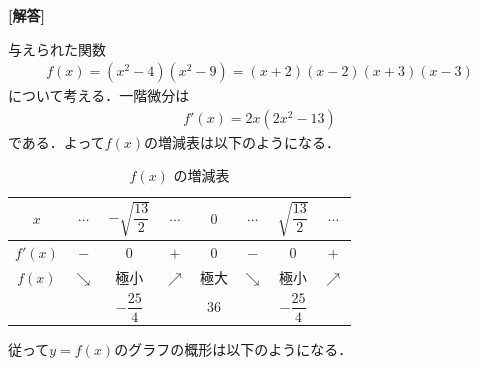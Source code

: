 \documentclass[../../main.tex]{subfiles}
\begin{document}
\begin{oframed}
  
\end{oframed}
{\bf [解答]}

与えられた関数
\begin{align}
  f(x) = (x^2-4)(x^2-9) = (x+2)(x-2)(x+3)(x-3) \label{eq:1}
\end{align}
について考える．一階微分は
\begin{align}
  f'(x)=2x(2x^2-13) \label{eq:2}
\end{align}
である．よって$f(x)$の増減表は以下のようになる．

\begin{table}[htb]
  \centering
  \caption{$f(x)$ の増減表}
  \renewcommand{\arraystretch}{1.3}
  \begin{tabular}{c|ccccccc}
    $x$ & $\cdots$ & $-\sqrt{\dfrac{13}{2}}$ & $\cdots$ & $0$ & $\cdots$ & $\sqrt{\dfrac{13}{2}}$ & $\cdots$ \\
    \hline
    $f'(x)$ & $-$ & $0$ & $+$ & $0$ & $-$ & $0$ & $+$ \\
    \hline
    $f(x)$ & $\searrow$ & 極小 & $\nearrow$ & 極大 & $\searrow$ & 極小 & $\nearrow$ \\
    &            & $-\dfrac{25}{4}$ &    & $36$ &            & $-\dfrac{25}{4}$ &
  \end{tabular}
\end{table}

従って$y=f(x)$のグラフの概形は以下のようになる．
\end{document}
